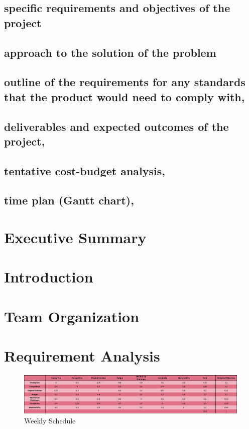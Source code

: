 \documentclass[a4paper,12pt]{article}
\begin{document}
\subsection{specific requirements and objectives of the project}


\subsection{approach to the solution of the problem}


\subsection{outline of the requirements for any standards that the product would need to comply with,}


\subsection{deliverables and expected outcomes of the project,}


\subsection{tentative cost-budget analysis,}

\subsection{time plan (Gantt chart),}



\section{Executive Summary}


\section{Introduction}


\section{Team Organization}


\section{Requirement Analysis}

\begin{figure}[H]
	\centering
	\includegraphics[width=\textwidth,height=\textheight,keepaspectratio]{images/objective_tree} 
	\caption{\label{fig:schedule}Weekly Schedule}
	
\end{figure}
\end{document}
